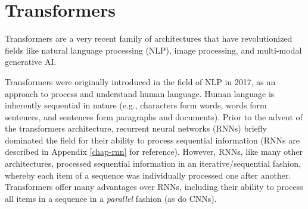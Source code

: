 \chapter{Transformers}
\label{chap-transformers}

Transformers are a very recent family of architectures that have revolutionized fields like natural language processing (NLP), image processing, and multi-modal generative AI.


Transformers were originally introduced in the field of NLP in 2017, as an approach to process and understand human language. Human language is inherently sequential in nature (e.g., characters form words, words form sentences, and sentences form paragraphs and documents). Prior to the advent of the transformers architecture, recurrent neural networks (RNNs) briefly dominated the field for their ability to process sequential information (RNNs are described in Appendix \ref{chap-rnn} for reference). However, RNNs, like many other architectures, processed sequential information in an iterative/sequential fashion, whereby each item of a sequence was individually processed one after another. Transformers offer many advantages over RNNs, including their ability to process all items in a sequence in a \textit{parallel} fashion (as do CNNs).



